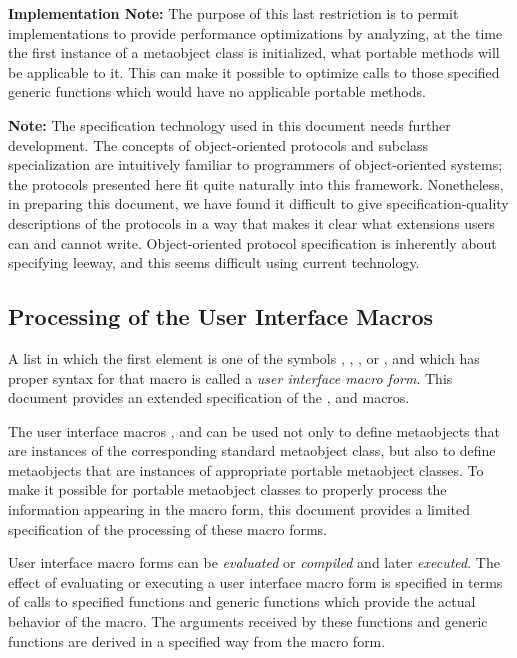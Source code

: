 \begin{itemize}
    \textbf{Implementation Note:} The purpose of this last restriction is to
    permit implementations to provide performance optimizations by analyzing, at
    the time the first instance of a metaobject class is initialized, what
    portable methods will be applicable to it. This can make it possible to
    optimize calls to those specified generic functions which would have no
    applicable portable methods. 

    \textbf{Note:} The specification technology used in this document needs
    further development. The concepts of object-oriented protocols and subclass
    specialization are intuitively familiar to programmers of object-oriented
    systems; the protocols presented here fit quite naturally into this
    framework. Nonetheless, in preparing this document, we have found it
    difficult to give specification-quality descriptions of the protocols in a
    way that makes it clear what extensions users can and cannot
    write. Object-oriented protocol specification is inherently about specifying
    leeway, and this seems difficult using current technology. 
  \end{itemize}


\subsection{Processing of the User Interface Macros}

A list in which the first element is one of the symbols , ,
, or , and which has proper syntax for that
macro is called a \emph{user interface macro form}. This document provides an extended
specification of the ,  and  macros. 

The user interface macros ,  and  can be used not
only to define metaobjects that are instances of the corresponding standard
metaobject class, but also to define metaobjects that are instances of
appropriate portable metaobject classes. To make it possible for portable
metaobject classes to properly process the information appearing in the macro
form, this document provides a limited specification of the processing of these
macro forms. 

User interface macro forms can be \emph{evaluated} or \emph{compiled} and later
\emph{executed}. The 
effect of evaluating or executing a user interface macro form is specified in
terms of calls to specified functions and generic functions which provide the
actual behavior of the macro. The arguments received by these functions and
generic functions are derived in a specified way from the macro form. 

